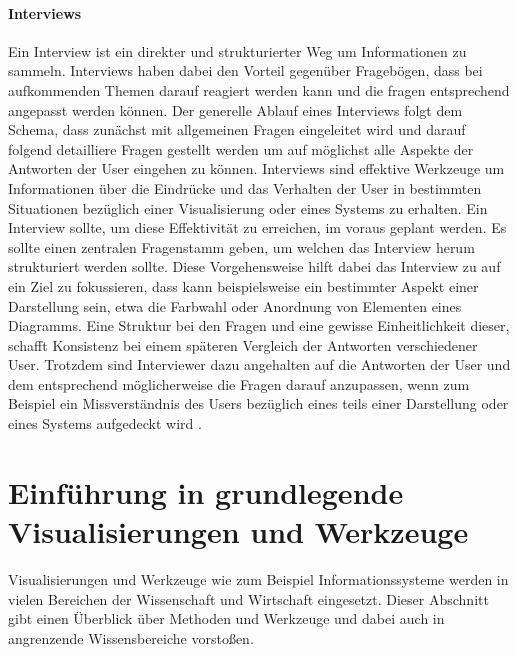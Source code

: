 \documentclass[draft=false
              ,paper=a4
              ,twoside=false
              ,fontsize=11pt
              ,headsepline
              ,BCOR10mm
              ,DIV11
              ]{scrbook}
\begin{document}
\paragraph{Interviews} %
\label{par:interviews}
Ein Interview ist ein direkter und strukturierter Weg um Informationen zu sammeln. Interviews haben dabei den Vorteil gegenüber Fragebögen, dass bei aufkommenden Themen darauf reagiert werden kann und die fragen entsprechend angepasst werden können. Der generelle Ablauf eines Interviews folgt dem Schema, dass zunächst mit allgemeinen Fragen eingeleitet wird und darauf folgend detailliere Fragen gestellt werden um auf möglichst alle Aspekte der Antworten der User eingehen zu können.
Interviews sind effektive Werkzeuge um Informationen über die Eindrücke und das Verhalten der User in bestimmten Situationen bezüglich einer Visualisierung oder eines Systems zu erhalten. Ein Interview sollte, um diese Effektivität zu erreichen, im voraus geplant werden. Es sollte einen zentralen Fragenstamm geben, um welchen das Interview herum strukturiert werden sollte. Diese Vorgehensweise hilft dabei das Interview zu auf ein Ziel zu fokussieren, dass kann beispielsweise ein bestimmter Aspekt einer Darstellung sein, etwa die Farbwahl oder Anordnung von Elementen eines Diagramms. Eine Struktur bei den Fragen und eine gewisse Einheitlichkeit dieser, schafft Konsistenz bei einem späteren Vergleich der Antworten verschiedener User. Trotzdem sind Interviewer dazu angehalten auf die Antworten der User und dem entsprechend möglicherweise die Fragen darauf anzupassen, wenn zum Beispiel ein Missverständnis des Users bezüglich eines teils einer Darstellung oder eines Systems aufgedeckt wird \cite{ader_advising_2008}.

\section{Einführung in grundlegende Visualisierungen und Werkzeuge} %
\label{sec:visualisierungen_und_werkzeuge}

Visualisierungen und Werkzeuge wie zum Beispiel Informationssysteme werden in vielen Bereichen der Wissenschaft und Wirtschaft eingesetzt. Dieser Abschnitt gibt einen Überblick über Methoden und Werkzeuge und dabei auch in angrenzende Wissensbereiche vorstoßen. 
\end{document}
